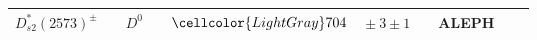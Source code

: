 {\begin{tabular}{cp{5pt}cp{5pt}r@{}lp{5pt}cp{5pt}c}
		\multirow{1}{*}{$D_{s2}^{*}(2573)^{\pm}$}       &   & $D^{0}$                                      & \cellcolor{LightGray} & $	\cellcolor{LightGray} 704$ & \cellcolor{LightGray}${}\pm3\pm1	$             & \cellcolor{LightGray} & \cellcolor{LightGray}ALEPH    & \cellcolor{LightGray} & \cite{Heister:2001nj}   \\ \bottomrule
	\end{tabular}}